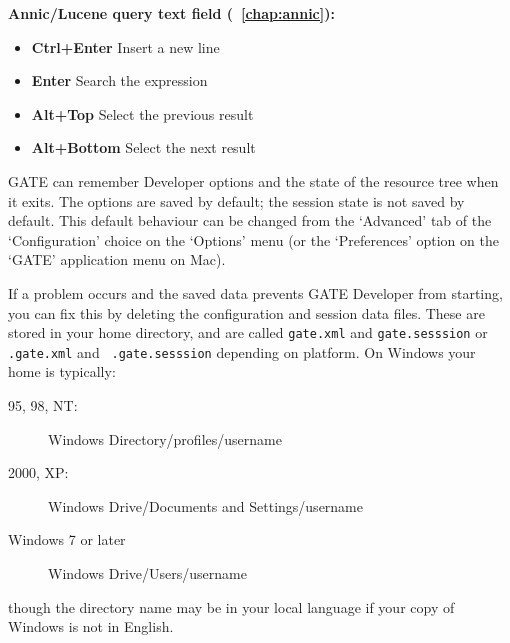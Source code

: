 {\bf Annic/Lucene query text field (\Chapthing~\ref{chap:annic}):}

\begin{itemize}
\item {\bf Ctrl+Enter} Insert a new line
\item {\bf Enter} Search the expression
\item {\bf Alt+Top} Select the previous result
\item {\bf Alt+Bottom} Select the next result
\end{itemize}




GATE can remember Developer options and the state of the resource tree when it
exits. The options are saved by default; the session state is not saved by
default. This default behaviour can be changed from the `Advanced' tab of
the `Configuration' choice on the `Options' menu (or the `Preferences' option
on the `GATE' application menu on Mac).

If a problem occurs and the saved data prevents GATE Developer from
starting, you can fix this by deleting the configuration and session
data files. These are stored in your home directory, and are called
{\tt gate.xml} and {\tt gate.sesssion} or {\tt .gate.xml} and {\tt
.gate.sesssion} depending on platform.  On Windows your home is typically:
\begin{description}
\item[95, 98, NT:] Windows Directory/profiles/username
\item[2000, XP:] Windows Drive/Documents and Settings/username
\item[Windows 7 or later] Windows Drive/Users/username
\end{description}
though the directory name may be in your local language if your copy of Windows
is not in English.



